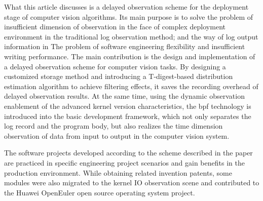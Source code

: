 \documentclass[master]{shtthesis}
\begin{document}
\begin{abstract*}[flattitle]
What this article discusses is a delayed observation scheme for the deployment stage of computer vision algorithms. Its main purpose is to solve the problem of insufficient dimension of observation in the face of complex deployment environment in the traditional log observation method; and the way of log output information in The problem of software engineering flexibility and insufficient writing performance. The main contribution is the design and implementation of a delayed observation scheme for computer vision tasks. By designing a customized storage method and introducing a T-digest-based distribution estimation algorithm to achieve filtering effects, it saves the recording overhead of delayed observation results. At the same time, using the dynamic observation enablement of the advanced kernel version characteristics, the bpf technology is introduced into the basic development framework, which not only separates the log record and the program body, but also realizes the time dimension observation of data from input to output in the computer vision system.

The software projects developed according to the scheme described in the paper are practiced in specific engineering project scenarios and gain benefits in the production environment. While obtaining related invention patents, some modules were also migrated to the kernel IO observation scene and contributed to the Huawei OpenEuler open source operating system project.
\end{abstract*}

\makeindices
\end{document}
